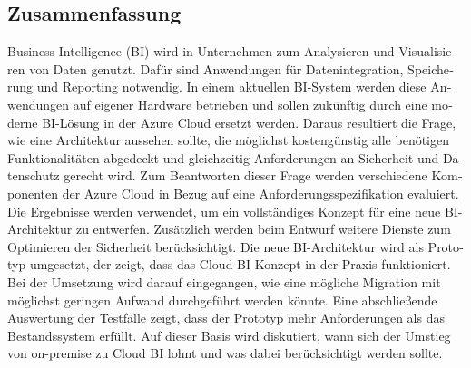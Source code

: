 \begin{otherlanguage}{ngerman}
	\chapter*{Zusammenfassung}
Business Intelligence (BI) wird in Unternehmen zum Analysieren und Visualisieren von Daten genutzt. Dafür sind Anwendungen für Datenintegration, Speicherung und Reporting notwendig. In einem aktuellen BI-System werden diese Anwendungen auf eigener Hardware betrieben und sollen zukünftig durch eine moderne BI-Lösung in der Azure Cloud ersetzt werden. Daraus resultiert die Frage, wie eine Architektur aussehen sollte, die möglichst kostengünstig alle benötigen Funktionalitäten abgedeckt und gleichzeitig Anforderungen an Sicherheit und Datenschutz gerecht wird. Zum Beantworten dieser Frage werden verschiedene Komponenten der Azure Cloud in Bezug auf eine Anforderungsspezifikation evaluiert. Die Ergebnisse werden verwendet, um ein vollständiges Konzept für eine neue BI-Architektur zu entwerfen. Zusätzlich werden beim Entwurf weitere Dienste zum Optimieren der Sicherheit berücksichtigt. Die neue BI-Architektur wird als Prototyp umgesetzt, der zeigt, dass das Cloud-BI Konzept in der Praxis funktioniert. Bei der Umsetzung wird darauf eingegangen, wie eine mögliche Migration mit möglichst geringen Aufwand durchgeführt werden könnte. Eine abschließende Auswertung der Testfälle zeigt, dass der Prototyp mehr Anforderungen als das Bestandssystem erfüllt. Auf dieser Basis wird diskutiert, wann sich der Umstieg von on-premise zu Cloud BI lohnt und was dabei berücksichtigt werden sollte.
\end{otherlanguage}